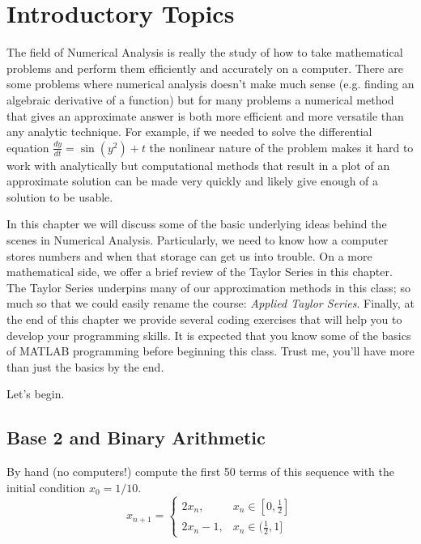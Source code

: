 \chapter{Introductory Topics}
The field of Numerical Analysis is really the study of how to take
mathematical problems and perform them efficiently and accurately on a computer.  There
are some problems where numerical analysis doesn't make much sense (e.g. finding an
algebraic derivative of a function) but for many problems a numerical method that gives an
approximate answer is both more efficient and more versatile than any analytic technique.
For example, if we needed to solve the differential equation $\frac{dy}{dt} = \sin(y^2) +
t$ the nonlinear nature of the problem makes it hard to work with analytically but
computational methods that result in a plot of an approximate solution can be made very
quickly and likely give enough of a solution to be usable.  

In this chapter we will discuss some of the basic underlying ideas behind the scenes in
Numerical Analysis.  Particularly, we need to know how a computer stores numbers and when that
storage can get us into trouble.  On a more mathematical side, we offer a brief review of
the Taylor Series in this chapter. The Taylor Series underpins many of our approximation
methods in this class; so much so that we could easily rename the course: {\it Applied Taylor
Series}.  Finally, at the end of this chapter we provide several coding exercises that
will help you to develop your programming skills.  It is expected that you know some of
the basics of MATLAB programming before beginning this class.  Trust me, you'll have more
than just the basics by the end.

\begin{center}
    Let's begin.
\end{center}
\section{Base 2 and Binary Arithmetic}
\begin{problem}\label{prob:base_10_faila}
    By hand (no computers!) compute the first 50 terms of this sequence with the initial condition $x_0 = 1/10$.
    \[ x_{n+1} = \left\{ \begin{array}{ll} 2x_n, & x_n \in [0,\frac{1}{2}] \\ 2x_n - 1, & x_n \in (\frac{1}{2},1] \end{array} \right. \]
    \end{problem}
\solution{
\[ x_n = \{1/10, 2/10, 4/10, 8/10, 6/10, 2/10, 4/10, 8/10, 6/10, \ldots \} \]
}

